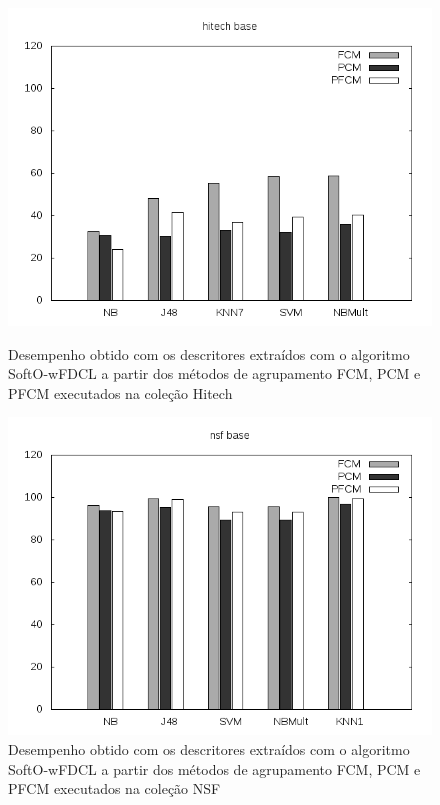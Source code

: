 \begin{figure}[!htp] \centering 
   \begin{minipage}{0.45\textwidth} 
     \centering
    \includegraphics[width=1.0\columnwidth]{assets/pfcm/hitech} 
    \caption{Desempenho obtido com os descritores extraídos com o algoritmo SoftO-wFDCL a partir dos
      métodos de agrupamento FCM,
    PCM e PFCM executados na coleção Hitech} 
  \label{fig:pfcmhitech}
  \end{minipage}\hfill 
  \begin{minipage}{0.45\textwidth} \centering
    \includegraphics[width=1.0\columnwidth]{assets/pfcm/nsf} 
    \caption{Desempenho obtido com os descritores extraídos com o algoritmo SoftO-wFDCL a partir dos
      métodos de agrupamento FCM,
    PCM e PFCM executados na coleção NSF} 
     \label{fig:pfcmnsf} 
   \end{minipage} 
\end{figure}

